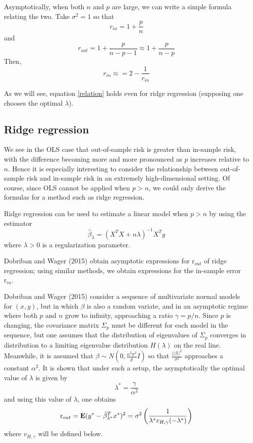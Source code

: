 \documentclass[11pt]{article}
\begin{document}
Asymptotically, when both $n$ and $p$ are large, we can write a simple formula relating the two.
Take $\sigma^2 = 1$ so that
\[
r_{in} = 1 + \frac{p}{n}
\]
and
\[
r_{out} = 1 + \frac{p}{n-p-1} \approx 1 + \frac{p}{n-p}
\]
Then,
\begin{equation}\label{relation}
r_{in} \approx = 2 - \frac{1}{r_{in}}
\end{equation}

As we will see, equation \eqref{relation} holds even for ridge regression (supposing one chooses the optimal $\lambda$).

\subsection{Ridge regression}

We see in the OLS case that out-of-sample risk is greater than
in-sample risk, with the difference becoming more and more pronounced
as $p$ increases relative to $n$.  Hence it is especially interesting
to consider the relationship between out-of-sample risk and in-sample
risk in an extremely high-dimensional setting.  Of course, since OLS
cannot be applied when $p > n$, we could only derive the formulas for
a method such as ridge regression.

Ridge regression can be used to estimate a linear model when $p > n$
by using the estimator
\[
\hat{\beta}_\lambda = (X^T X + n\lambda)^{-1} X^T y
\]
where $\lambda > 0$ is a regularization parameter.

Dobriban and Wager (2015) obtain asymptotic expressions for
$\text{r}_{out}$ of ridge regression; using similar methods, we obtain expressions for the in-sample error $\text{r}_{in}$.

Dobriban and Wager (2015) consider a sequence of multivariate normal
models for $(x,y)$, but in which $\beta$ is also a random variate, and
in an asymptotic regime where both $p$ and $n$ grow to infinity,
approaching a ratio $\gamma = p/n$.  Since $p$ is changing, the
covariance matrix $\Sigma_p$ must be different for each model in the
sequence, but one assumes that the distribution of eigenvalues of
$\Sigma_p$ converges in distribution to a limiting eigenvalue
distribution $H(\lambda)$ on the real line.  Meanwhile, it is assumed
that $\beta \sim N(0, \frac{\alpha^2\sigma^2}{p} I)$ so that $\frac{||\beta||^2}{\sigma^2}$ approaches a constant $\alpha^2$.  It is
shown that under such a setup, the asymptotically
the optimal value of $\lambda$ is given by
\[
\lambda^* = \frac{\gamma}{\alpha^2}
\]
and using this value of $\lambda$, one obtains
\[
\text{r}_{out} = \textbf{E}(y^* - \hat{\beta}_{\lambda^*}^T x^*)^2 =  \sigma^2\left(\frac{1}{\lambda^* v_{H, \gamma}(-\lambda^*)}\right)
\]
where $v_{H,\gamma}$ will be defined below.
\end{document}
